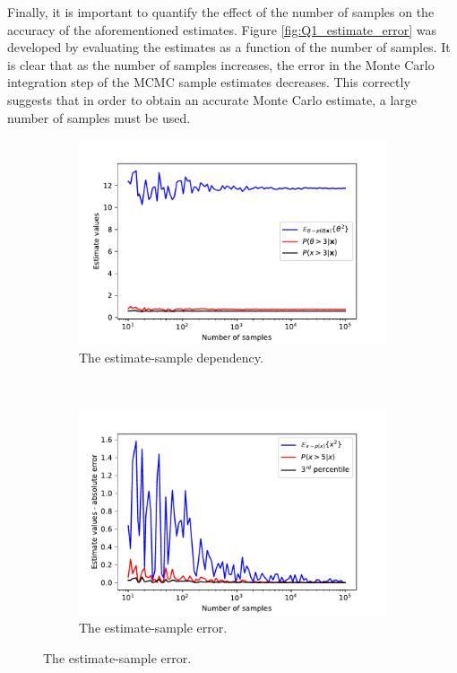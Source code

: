 \documentclass{article}
\begin{document}
	Finally, it is important to quantify the effect of the number of samples on the accuracy of the aforementioned estimates. Figure \ref{fig:Q1_estimate_error} was developed by evaluating the estimates as a function of the number of samples. It is clear that as the number of samples increases, the error in the Monte Carlo integration step of the MCMC sample estimates decreases. This correctly suggests that in order to obtain an accurate Monte Carlo estimate, a large number of samples must be used. 
	\begin{figure}[htb!]
		\centering
		\begin{subfigure}[b]{0.45\textwidth}
			\centering
			\includegraphics[width=\textwidth]{Q2g_1.pdf}
			\caption{The estimate-sample dependency.}
		\end{subfigure}
		~
		\begin{subfigure}[b]{0.45\textwidth}
			\centering
			\includegraphics[width=\textwidth]{Q2g_2.pdf}
			\caption{The estimate-sample error.}
		\end{subfigure}
		

\end{figure}
\end{document}
